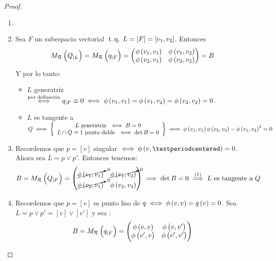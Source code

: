 \begin{proof}
  \begin{enumerate}[(1)]
    \item[]
    \item Sea $F$ un subespacio vectorial $\operatorname{\;t.q.\;} L=[F]=[v_1,v_2]$. Entonces
      \[
        M_{\mathcal{R}} \left( Q_{|L} \right) = M_{\mathcal{R}} \left( q_{|F}\right) =
        \begin{pmatrix}
          \phi\left( v_1,v_1\right) & \phi\left( v_1,v_2\right)\\
          \phi\left( v_2,v_1\right) & \phi\left( v_2,v_2\right)\\
        \end{pmatrix} =B
      \]
      Y por lo tanto:
      \begin{itemize}
        \item $L$ generatriz $\stackrel{\text{por definición}}{\iff} q_{|F}\equiv 0
          \iff \phi\left( v_1,v_1\right) = \phi\left( v_1,v_2\right) = \phi\left( v_2,v_2\right)=0$.
        \item $L$ es tangente a $Q \iff \left\{
            \begin{array}{c}
              L \text{ generatriz }  \iff B=0 \\
              L\cap Q \equiv 1 \text{ punto doble }  \iff \det B=0\\
            \end{array}\right\} \iff \phi\left( v_1,v_1\right) \phi\left( v_2,v_2\right) - \phi\left( v_1,v_2\right) ^2 =0$
      \end{itemize}
    \item Recordemos que $p=[v]$ singular $\iff \phi\lp v,·\rp=0$. Ahora sea $L=p\vee p'$.
      Entonces tenemos:
      \[
        B=M_{\mathcal{R}}\left( Q_{|F}\right) = 
        \begin{pmatrix}
          \cancelto{0}{\phi\left( v_1,v_1\right)} & \cancelto{0}{\phi\left( v_1,v_2\right)}\\
          \cancelto{0}{\phi\left( v_2,v_1\right)} & \phi\left( v_2,v_2\right)
        \end{pmatrix} \implies \det B=0 \stackrel{(1)}{\implies} L \text{ es tangente a } Q
      \]
    \item Recordemos que $p=[v]$ es punto liso de $q \iff \phi\left( v,v\right) = q\left( v\right) =0$.
      Sea $L=p\vee p' = [v]\vee [v']$ y sea :
      \[
        B=M_{\mathcal{R}} \left( q_{|F}\right) = 
        \begin{pmatrix}
          \phi\left( v,v\right) & \phi\left( v,v'\right)\\
          \phi\left( v',v\right) & \phi\left( v',v'\right)\\
        \end{pmatrix}
\]
\end{enumerate}
\end{proof}
